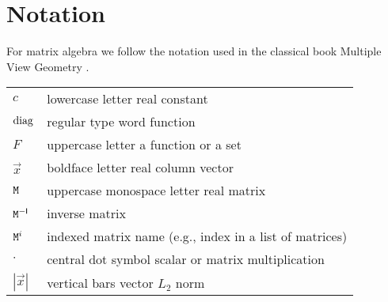\section{Notation}

For matrix algebra we follow the notation used in the classical book Multiple View Geometry \cite{hartley03}.

\begin{table}[h!]
\centering
\begin{tabularx}{\textwidth}{lX}
$c$ & lowercase letter \dotfill real constant \\
$\mathrm{diag}$ & regular type word \dotfill function \\
$F$ & uppercase letter \dotfill a function or a set \\
$\vec x$ & boldface letter \dotfill real column vector \\
$\mathtt{M}$ & uppercase monospace letter \dotfill real matrix \\
$\mathtt{M}^{-\mathsf{I}}$ & \dotfill inverse matrix \\
$\mathtt{M}^i$ & \dotfill indexed matrix name (e.g., index in a list of matrices) \\
$\cdot$ & central dot symbol \dotfill scalar or matrix multiplication \\
$|\vec x|$ & vertical bars \dotfill vector $L_2$ norm \\
\end{tabularx}
\end{table}
